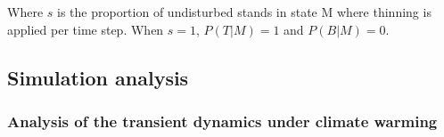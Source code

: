 \documentclass[12pt]{article}
\begin{document}
Where \(s\) is the proportion of undisturbed stands in state M where
thinning is applied per time step. When \(s=1\), \(P(T|M) = 1\) and
\(P(B|M) = 0\).

\hypertarget{simulation-analysis}{%
\subsection{Simulation analysis}\label{simulation-analysis}}

\hypertarget{analysis-of-the-transient-dynamics-under-climate-warming}{%
\subsubsection{Analysis of the transient dynamics under climate
warming}\label{analysis-of-the-transient-dynamics-under-climate-warming}}
\end{document}
